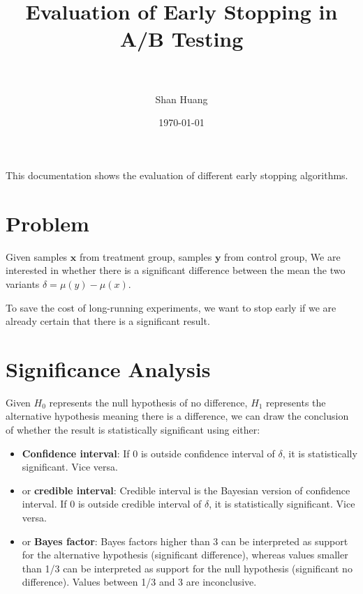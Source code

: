 \documentclass[paper=a4, fontsize=11pt]{scrartcl} %
\title{	
\normalfont \normalsize 
\textsc{} \\ [25pt] %
\horrule{0.5pt} \\[0.4cm] %
\huge Evaluation of Early Stopping in A/B Testing  \\ %
\horrule{2pt} \\[0.5cm] %
}
\author{Shan Huang} %
\date{\normalsize\today} %
\numberwithin{equation}{section} %
\numberwithin{figure}{section} %
\numberwithin{table}{section} %
\begin{document}
\maketitle %


This documentation shows the evaluation of different early stopping algorithms. 

\section{Problem}
Given samples $\textbf{x}$ from treatment group, samples $\textbf{y}$ from control group, We are interested in whether there is a significant difference  between the mean the two variants $\delta = \mu(y)-\mu(x)$.

To save the cost of long-running experiments, we want to stop early if we are already certain that there is a significant result.

\section{Significance Analysis}
\label{sec:byt}
Given $H_0$ represents the null hypothesis of no difference, $H_1$ represents the alternative hypothesis meaning there is a difference, we can draw the conclusion of whether the result is statistically significant using either:

\begin{itemize}  
\item \textbf{Confidence interval}: If 0 is outside confidence interval of $\delta$, it is statistically significant. Vice versa.
\item or \textbf{credible interval}: Credible interval is the Bayesian version of confidence interval. If 0 is outside credible interval of $\delta$, it is statistically significant. Vice versa.
\item or \textbf{Bayes factor}: Bayes factors higher than 3 can be interpreted as support for the alternative hypothesis (significant difference), whereas values smaller than 1/3 can be interpreted as support for the null hypothesis (significant no difference). Values between 1/3 and 3 are inconclusive. 
\end{itemize}
\end{document}
